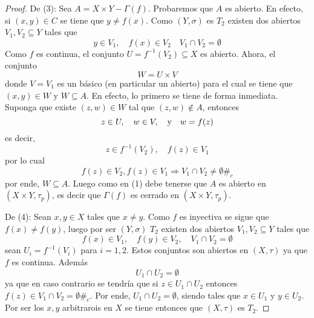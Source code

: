 \documentclass[12pt]{report}
\theoremstyle{largebreak}
\newcommand\contradiction{\ensuremath{\#_c}}
\begin{document}
\begin{proof}
        De (3): Sea $A=X\times Y-\Gamma(f)$. Probaremos que $A$ es abierto. En efecto, si $(x,y)\in C$ se tiene que $y\neq f(x)$. Como $(Y,\sigma)$ es $T_2$ existen dos abiertos $V_1,V_2\subseteq Y$ tales que 
        \begin{equation*}
            y\in V_1,\quad f(x)\in V_2\quad V_1\cap V_2=\emptyset
        \end{equation*}
        Como $f$ es continua, el conjunto $U=f^{-1}(V_2)\subseteq X$ es abierto. Ahora, el conjunto
        \begin{equation*}
            W=U\times V
        \end{equation*}
        donde $V=V_1$ es un básico (en particular un abierto) para el cual se tiene que $(x,y)\in W$ y $W\subseteq A$. En efecto, lo primero se tiene de forma inmediata. Suponga que existe $(z,w)\in W$ tal que $(z,w)\notin A$, entonces
        \begin{equation*}
            z\in U,\quad w\in V,\quad\textup{y}\quad w=f(z)
        \end{equation*}
        es decir,
        \begin{equation*}
            z\in f^{-1}(V_2),\quad f(z)\in V_1
        \end{equation*}
        por lo cual
        \begin{equation*}
            f(z)\in V_2, f(z)\in V_1\Rightarrow V_1\cap V_2\neq\emptyset\contradiction
        \end{equation*}
        por ende, $W\subseteq A$. Luego como en (1) debe tenerse que $A$ es abierto en $(X\times Y,\tau_p)$, es decir que $\Gamma(f)$ es cerrado en $(X\times Y,\tau_p)$.

        De (4): Sean $x,y\in X$ tales que $x\neq y$. Como $f$ es inyectiva se sigue que $f(x)\neq f(y)$, luego por ser $(Y,\sigma)$ $T_2$ existen dos abiertos $V_1,V_2\subseteq Y$ tales
        que
        \begin{equation*}
            f(x)\in V_1,\quad f(y)\in V_2,\quad V_1\cap V_2=\emptyset
        \end{equation*}
        sean $U_i=f^{-1}(V_i)$ para $i=1,2$. Estos conjuntos son abiertos en $(X,\tau)$ ya que $f$ es continua. Además
        \begin{equation*}
            U_1\cap U_2=\emptyset
        \end{equation*}
        ya que en caso contrario se tendría que si $z\in U_1\cap U_2$ entonces $f(z)\in V_1\cap V_2=\emptyset$\contradiction. Por ende, $U_1\cap U_2=\emptyset$, siendo tales que $x\in U_1$ y $y\in U_2$. Por ser los $x,y$ arbitrarois en $X$ se tiene entonces que $(X,\tau)$ es $T_2$.
    \end{proof}
\end{document}
